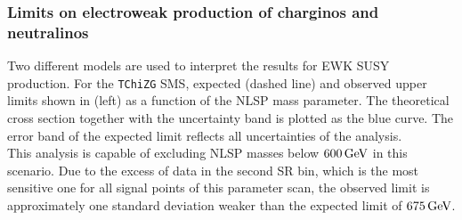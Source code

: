 \subsubsection*{Limits on electroweak production of charginos and neutralinos}
Two different models are used to interpret the results for EWK SUSY production. For the \texttt{TChiZG} SMS, expected (dashed line) and observed upper limits shown in  (left) as a function of the NLSP mass parameter. The theoretical cross section together with the uncertainty band is plotted as the blue curve.
The error band of the expected limit reflects all uncertainties of the analysis.\\
This analysis is capable of excluding NLSP masses below $600\,\text{Ge\hspace{-.08em}V}$ in this scenario. Due to the excess of data in the second SR bin, which is the most sensitive one for all signal points of this parameter scan, the observed limit is approximately one standard deviation weaker than the expected limit of $675\,\text{Ge\hspace{-.08em}V}$.\\
